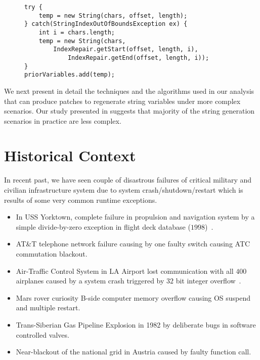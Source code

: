 \lstset{language=java, caption=Patch for the Apache Log4j bug.,
label = snippet:exampleRepairing4, firstnumber =4}
\begin{figure}[t]
\centering
\begin{lstlisting}
try {
    temp = new String(chars, offset, length);
} catch(StringIndexOutOfBoundsException ex) {
    int i = chars.length;
    temp = new String(chars,
        IndexRepair.getStart(offset, length, i),
            IndexRepair.getEnd(offset, length, i));
}
priorVariables.add(temp);
\end{lstlisting}
\end{figure}

We next present in detail the techniques and the algorithms used in our analysis
that can produce patches to regenerate string variables under more complex
scenarios. Our study presented in  suggests that majority
of the string generation scenarios in practice are less complex.

\section{Historical Context}
\label{section:historicalContext}

In recent past, we have seen couple of disastrous failures of critical military
and civilian infrastructure system due to system crash/shutdown/restart which is
results of some very common runtime exceptions.

\begin{itemize}
  
  \item In USS Yorktown, complete failure in propulsion and navigation system by
  a simple divide-by-zero exception in flight deck database
  ($1998$)~\cite{Ship}.
  
  \item AT\&T telephone network failure causing by one faulty switch causing ATC
  commutation blackout.
  
  \item Air-Traffic Control System in LA Airport lost communication with all
  $400$ airplanes caused by a system crash triggered by $32$ bit integer
  overflow~\cite{LAATC}.
  
  \item Mars rover curiosity B-side computer memory overflow causing OS suspend
  and multiple restart.
  
  \item Trans-Siberian Gas Pipeline Explosion in 1982 by deliberate bugs in
  software controlled valves.
  
  \item Near-blackout of the national grid in Austria caused by faulty function
  call.
  
\end{itemize}

